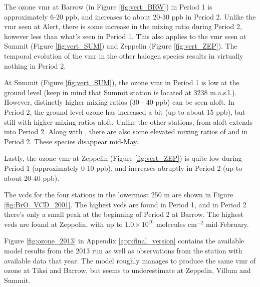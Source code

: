 \medskip

The ozone \acrshort{vmr} at Barrow (in Figure \ref{fig:vert_BRW}) in Period 1 is approximately 6-20 ppb, and increases to about 20-30 ppb in Period 2. Unlike the  \acrshort{vmr} seen at Alert, there is some increase in the mixing ratio during Period 2, however less than what's seen in Period 1. This also applies to the  \acrshort{vmr} seen at Summit (Figure \ref{fig:vert_SUM}) and Zeppelin (Figure \ref{fig:vert_ZEP}). The temporal evolution of the \acrshort{vmr} in the other halogen species results in virtually nothing in Period 2.

\medskip

At Summit (Figure \ref{fig:vert_SUM}), the ozone \acrshort{vmr} in Period 1 is low at the ground level (keep in mind that Summit station is located at 3238 m.a.s.l.). However, distinctly higher mixing ratios (30 - 40 ppb) can be seen aloft. In Period 2, the ground level ozone has increased a bit (up to about 15 ppb), but still with higher mixing ratios aloft. Unlike the other stations,  from aloft extends into Period 2. Along with , there are also some elevated mixing ratios of  and  in Period 2. These species disappear mid-May.

\medskip

Lastly, the ozone \acrshort{vmr} at Zeppelin (Figure \ref{fig:vert_ZEP}) is quite low during Period 1 (approximately 0-10 ppb), and increases abruptly in Period 2 (up to about 20-40 ppb). 









\medskip

The  \acrshort{vcd}s for the four stations in the lowermost 250 m are shown in Figure \ref{fig:BrO_VCD_2001}. The highest \acrshort{vcd}s are found in Period 1, and in Period 2 there's only a small peak at the beginning of Period 2 at Barrow. The highest \acrshort{vcd}s are found at Zeppelin, with up to $1.0\times10^{10}$ molecules cm$^{-2}$ mid-February.

\medskip

Figure \ref{fig:ozone_2013} in Appendix \ref{app:final_version} contains the available model results from the 2013 run as well as observations from the station with available data that year. The model roughly manages to produce the same \acrshort{vmr} of ozone at Tiksi and Barrow, but seems to underestimate at Zeppelin, Villum and Summit. 


